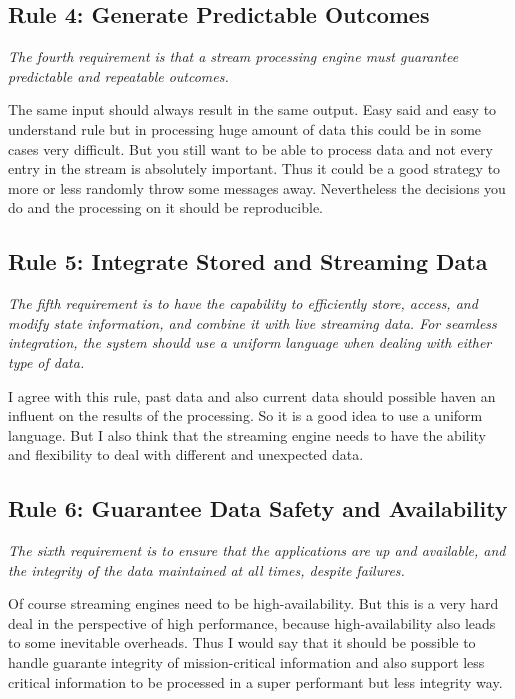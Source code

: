 \subsection{Rule 4: Generate Predictable Outcomes}
\textit{The fourth requirement is that a stream processing engine
        must guarantee predictable and repeatable outcomes.}

\medskip
The same input should always result in the same output.
Easy said and easy to understand rule but in processing huge amount of data this could be in some cases very difficult.
But you still want to be able to process data and not every entry in the stream is absolutely important.
Thus it could be a good strategy to more or less randomly throw some messages away.
Nevertheless the decisions you do and the processing on it should be reproducible.

\subsection{Rule 5: Integrate Stored and Streaming Data}
\textit{The fifth requirement is to have the capability to efficiently
        store, access, and modify state information, and combine it
        with live streaming data. For seamless integration, the
        system should use a uniform language when dealing with
        either type of data.}

\medskip
I agree with this rule, past data and also current data should possible haven an influent
on the results of the processing. So it is a good idea to use a uniform language.
But I also think that the streaming engine needs to have the ability and flexibility to deal with different
and unexpected data.

\newpage
\subsection{Rule 6: Guarantee Data Safety and Availability}
\textit{The sixth requirement is to ensure that the applications are
        up and available, and the integrity of the data maintained at
        all times, despite failures.}

\medskip
Of course streaming engines need to be high-availability.
But this is a very hard deal in the perspective of high performance,
because high-availability also leads to some inevitable overheads.
Thus I would say that it should be possible to handle guarante integrity of mission-critical information
and also support less critical information to be processed in a super performant but less integrity way.

